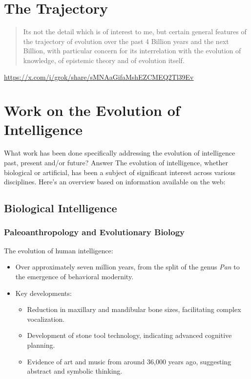 \documentclass[12pt,titlepage]{book}
\begin{document}
   \section{The Trajectory}


   \begin{quotation}Its not the detail which is of interest to me, but certain general features of the trajectory of evolution over the past 4 Billion years and the next Billion, with particular concern for its interrelation with the evolution of knowledge, of epistemic theory and of evolution itself.
   \end{quotation}
   
   \url{https://x.com/i/grok/share/sMNAaGifaMshEZCMEQ2Tl39Ev}

\section{Work on the Evolution of Intelligence}
   
   What work has been done specifically addressing the evolution of intelligence past, present and/or future?
Answer
The evolution of intelligence, whether biological or artificial, has been a subject of significant interest across various disciplines. Here's an overview based on information available on the web:

\subsection{Biological Intelligence}

\subsubsection{Paleoanthropology and Evolutionary Biology}
The evolution of human intelligence:
\begin{itemize}
    \item Over approximately seven million years, from the split of the genus \emph{Pan} to the emergence of behavioral modernity.
    \item Key developments:
    \begin{itemize}
        \item Reduction in maxillary and mandibular bone sizes, facilitating complex vocalization.
        \item Development of stone tool technology, indicating advanced cognitive planning.
        \item Evidence of art and music from around 36,000 years ago, suggesting abstract and symbolic thinking.
    \end{itemize}
\end{itemize}
\end{document}
